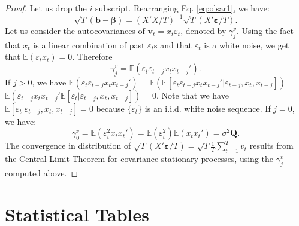 \documentclass[
  12pt,
]{book}
\theoremstyle{definition}
\theoremstyle{definition}
\theoremstyle{definition}
\theoremstyle{definition}
\theoremstyle{remark}
\begin{document}
\begin{proof}
Let us drop the \(i\) subscript. Rearranging Eq. \eqref{eq:olsar1}, we have:
\[
\sqrt{T}(\mathbf{b}-\boldsymbol{\beta}) =  (X'X/T)^{-1}\sqrt{T}(X'\boldsymbol\varepsilon/T).
\]
Let us consider the autocovariances of \(\mathbf{v}_t = x_t \varepsilon_t\), denoted by \(\gamma^v_j\). Using the fact that \(x_t\) is a linear combination of past \(\varepsilon_t\)s and that \(\varepsilon_t\) is a white noise, we get that \(\mathbb{E}(\varepsilon_t x_t)=0\). Therefore
\[
\gamma^v_j = \mathbb{E}(\varepsilon_t\varepsilon_{t-j}x_tx_{t-j}').
\]
If \(j>0\), we have \(\mathbb{E}(\varepsilon_t\varepsilon_{t-j}x_tx_{t-j}')=\mathbb{E}(\mathbb{E}[\varepsilon_t\varepsilon_{t-j}x_tx_{t-j}'|\varepsilon_{t-j},x_t,x_{t-j}])=\) \(\mathbb{E}(\varepsilon_{t-j}x_tx_{t-j}'\mathbb{E}[\varepsilon_t|\varepsilon_{t-j},x_t,x_{t-j}])=0\). Note that we have \(\mathbb{E}[\varepsilon_t|\varepsilon_{t-j},x_t,x_{t-j}]=0\) because \(\{\varepsilon_t\}\) is an i.i.d. white noise sequence. If \(j=0\), we have:
\[
\gamma^v_0 = \mathbb{E}(\varepsilon_t^2x_tx_{t}')= \mathbb{E}(\varepsilon_t^2) \mathbb{E}(x_tx_{t}')=\sigma^2\mathbf{Q}.
\]
The convergence in distribution of \(\sqrt{T}(X'\boldsymbol\varepsilon/T)=\sqrt{T}\frac{1}{T}\sum_{t=1}^Tv_t\) results from the Central Limit Theorem for covariance-stationary processes, using the \(\gamma_j^v\) computed above.
\end{proof}

\hypertarget{statistical-tables}{%
\section{Statistical Tables}\label{statistical-tables}}
\end{document}

